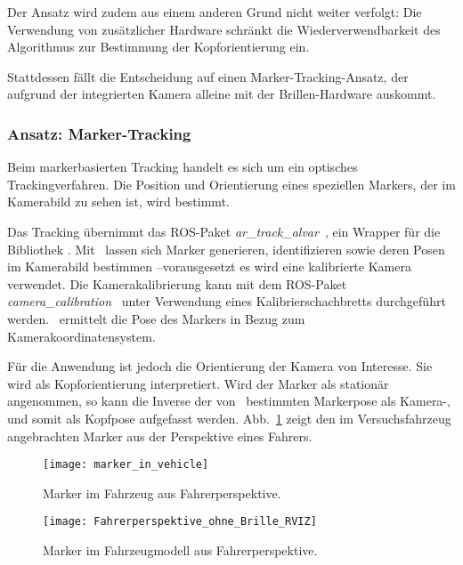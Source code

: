Der Ansatz wird zudem aus einem anderen Grund nicht weiter verfolgt:
Die Verwendung von zusätzlicher Hardware schränkt die Wiederverwendbarkeit des Algorithmus zur Bestimmung der Kopforientierung ein.

Stattdessen fällt die Entscheidung auf einen Marker-Tracking-Ansatz, der aufgrund der integrierten Kamera alleine mit der Brillen-Hardware auskommt.


\subsubsection{Ansatz: Marker-Tracking}
\label{headtracking_markertracking_subsubsec}

Beim markerbasierten Tracking handelt es sich um ein optisches Trackingverfahren.
Die Position und Orientierung eines speziellen Markers, der im Kamerabild zu sehen ist, wird bestimmt.

Das Tracking übernimmt das \ac{ROS}-Paket \emph{ar\_track\_alvar}~\cite{ros_ar_track_alvar}, ein Wrapper für die Bibliothek \alvar.
Mit \alvar \ lassen sich Marker generieren, identifizieren sowie deren Posen im Kamerabild bestimmen --vorausgesetzt es wird eine kalibrierte Kamera verwendet.
Die Kamerakalibrierung kann mit dem \ac{ROS}-Paket \emph{camera\_calibration}~\cite{ros_camera_calibration} unter Verwendung eines Kalibrierschachbretts durchgeführt werden.
\alvar \ ermittelt die Pose des Markers in Bezug zum Kamerakoordinatensystem.

Für die Anwendung ist jedoch die Orientierung der Kamera von Interesse.
Sie wird als Kopforientierung interpretiert.
Wird der Marker als stationär angenommen, so kann die Inverse der von \alvar \ bestimmten Markerpose als Kamera-, und somit als Kopfpose aufgefasst werden.
Abb.~\ref{fig:marker_in_vehicle_driver_view} zeigt den im Versuchsfahrzeug angebrachten Marker aus der Perspektive eines Fahrers.

\begin{figure}
  \centering
  \texttt{[image: marker\_in\_vehicle]}
  \caption{Marker im Fahrzeug aus Fahrerperspektive.}
  \label{fig:marker_in_vehicle_driver_view}
\end{figure}

\begin{figure}
  \centering
  \texttt{[image: Fahrerperspektive\_ohne\_Brille\_RVIZ]}
  \caption{Marker im Fahrzeugmodell aus Fahrerperspektive.}
  \label{fig:marker_in_vehicle_model_driver_view}
\end{figure}

